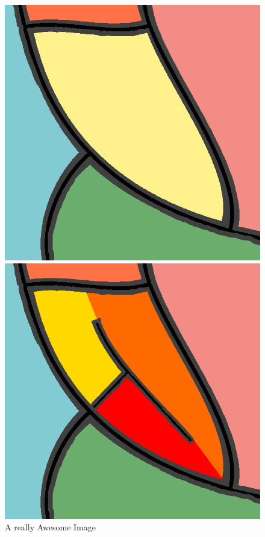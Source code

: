\begin{figure}[!htb]
    \includegraphics[width=\linewidth]{figure/method_generation_1.png}
    \caption{A really Awesome Image}\label{fig:awesome_image1}
  \endminipage\hfill
    \includegraphics[width=\linewidth]{figure/method_generation_2.png}

\end{figure}

